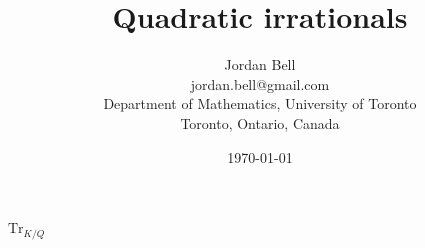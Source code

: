 \documentclass{article}
\def\Trace{\ensuremath{\mathrm{Tr}}}
\begin{document}
\title{Quadratic irrationals}
\author{Jordan Bell \\
jordan.bell@gmail.com \\
Department of Mathematics, University of Toronto\\
Toronto, Ontario, Canada}
\date{\today}




\maketitle

\cite{zbMATH02123719}

\cite{zbMATH00435565}

\cite{zbMATH05963391}

\cite{zbMATH07622015}

$\Trace_{K/Q}$



\end{document}

